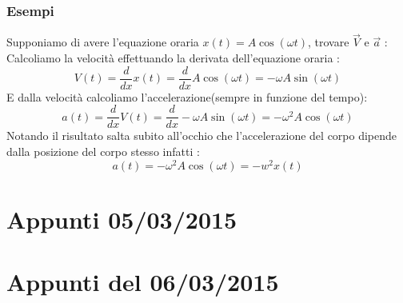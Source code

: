 \documentclass[fontsize = 20px, paper = a4]{article}
\begin{document}
\subsubsection{Esempi}
Supponiamo di avere l'equazione oraria $x(t) = A\cos(\omega t)$, trovare $\overrightarrow{V}$ e $\overrightarrow{a}$ : \\ 
Calcoliamo la velocità effettuando la derivata dell'equazione oraria :
$$V(t) = \frac{d}{dx}x(t)= \frac{d}{dx} A\cos(\omega t) = -\omega A \sin(\omega t)$$
E dalla velocità calcoliamo l'accelerazione(sempre in funzione del tempo):
$$a(t) = \frac{d}{dx}V(t) = \frac{d}{dx} -\omega A \sin(\omega t) = -\omega^2 A \cos (\omega t)$$
Notando il risultato salta subito all'occhio che l'accelerazione del corpo dipende dalla posizione del corpo stesso infatti :
$$a(t) = -\omega^2 A\cos (\omega t) =  -w^2x(t)$$

\section{Appunti 05/03/2015}
\section{Appunti del 06/03/2015}
\end{document}
